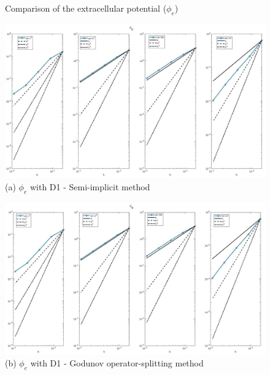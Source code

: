 \documentclass[a4paper,11pt]{article}
\begin{document}
\begin{figure}[h]
\caption{Comparison of the extracellular potential ($\phi_e$)}
\label{pe-time}
\begin{center}
\includegraphics[width = \textwidth]{./D1_Phie_1.jpg}
\caption*{(a) $\phi_e$ with D1 - Semi-implicit method}
\end{center}
\end{figure}
\begin{figure}[H]
\begin{center}
\includegraphics[width =\textwidth]{./D1_Phie_1_GO.jpg}
\caption*{(b) $\phi_e$ with D1 - Godunov operator-splitting method}
\end{center}
\end{figure}
\newpage
\end{document}
